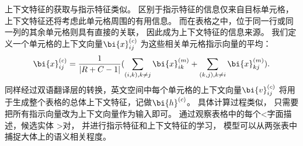 上下文特征的获取与指示特征类似。
区别于指示特征的信息仅来自目标单元格，
上下文特征还将考虑此单元格周围的有用信息。
而在表格之中，位于同一行或同一列的其余单元格则具有直接的关联，
因此成为上下文特征的信息来源。
我们定义一个单元格的上下文向量$\bi{x}_{ij}^{(c)}$
为这些相关单元格指示向量的平均：
\begin{equation}
    \bi{x}_{ij}^{(c)} = \frac{1}{|R+C-1|}(
      \sum_{(i,k), k \neq j} \bi{x}_{ik}^{(m)} +
      \sum_{(k,j), k \neq i} \bi{x}_{kj}^{(m)}
    ).
\end{equation}
\noindent
同样经过双语翻译层的转换，英文空间中每个单元格的上下文向量$\bi{v}_{ij}^{(c)}$
将用于生成整个表格的总体上下文特征，记做$\bi{h}^{(c)}$。
具体计算过程类似，
只需要把所有指示向量改为上下文向量作为输入即可。
通过观察表格中的每个\textless 字面描述，候选实体 \textgreater 对，
并进行指示特征和上下文特征的学习，
模型可以从两张表中捕捉大体上的语义相关程度。

%
%



